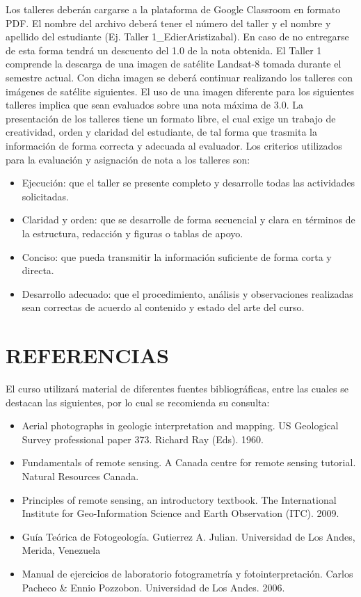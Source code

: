 \documentclass[a4paper,twoside,11pt,]{article}
\begin{document}
Los talleres deberán cargarse a la plataforma de Google Classroom en formato PDF. El nombre del archivo deberá tener el número del taller y el nombre y apellido del estudiante (Ej. Taller 1\_EdierAristizabal). En caso de no entregarse de esta forma tendrá un descuento del 1.0 de la nota obtenida.
El Taller 1 comprende la descarga de una imagen de satélite Landsat-8 tomada durante el semestre actual. Con dicha imagen se deberá continuar realizando los talleres con imágenes de satélite siguientes. El uso de una imagen diferente para los siguientes talleres implica que sean evaluados sobre una nota máxima de 3.0.
La presentación de los talleres tiene un formato libre, el cual exige un trabajo de creatividad, orden y claridad del estudiante, de tal forma que trasmita la información de forma correcta y adecuada al evaluador. Los criterios utilizados para la evaluación y asignación de nota a los talleres son:
\begin{itemize}
\item Ejecución: que el taller se presente completo y desarrolle todas las actividades solicitadas.
\item Claridad y orden: que se desarrolle de forma secuencial y clara en términos de la estructura, redacción y figuras o tablas de apoyo.
\item Conciso: que pueda transmitir la información suficiente de forma corta y directa.
\item Desarrollo adecuado: que el procedimiento, análisis y observaciones realizadas sean correctas de acuerdo al contenido y estado del arte del curso.
\end{itemize}

\section{REFERENCIAS}
El curso utilizará material de diferentes fuentes bibliográficas, entre las cuales se destacan las siguientes, por lo cual se recomienda su consulta:
\begin{itemize}
\item Aerial photographs in geologic interpretation and mapping. US Geological Survey professional paper 373. Richard Ray (Eds). 1960.
\item Fundamentals of remote sensing. A Canada centre for remote sensing tutorial. Natural Resources Canada. 
\item Principles of remote sensing, an introductory textbook. The International Institute for Geo-Information Science and Earth Observation (ITC). 2009.
\item Guía Teórica de Fotogeología. Gutierrez A. Julian. Universidad de Los Andes, Merida, Venezuela
\item Manual de ejercicios de laboratorio fotogrametría y fotointerpretación. Carlos Pacheco \& Ennio Pozzobon. Universidad de Los Andes. 2006.
\end{itemize}
\end{document}
